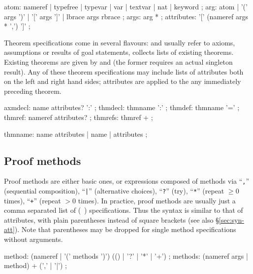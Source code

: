\begin{rail}
  atom: nameref | typefree | typevar | var | textvar | nat | keyword
  ;
  arg: atom | '(' args ')' | '[' args ']' | lbrace args rbrace
  ;
  args: arg *
  ;
  attributes: '[' (nameref args * ',') ']'
  ;
\end{rail}

Theorem specifications come in several flavours:  and
 usually refer to axioms, assumptions or results of goal
statements,  collects lists of existing theorems.
Existing theorems are given by  and 
(the former requires an actual singleton result).  Any of these theorem
specifications may include lists of attributes both on the left and right hand
sides; attributes are applied to the any immediately preceding theorem.

\begin{rail}
  axmdecl: name attributes? ':'
  ;
  thmdecl: thmname ':'
  ;
  thmdef: thmname '='
  ;
  thmref: nameref attributes?
  ;
  thmrefs: thmref +
  ;

  thmname: name attributes | name | attributes
  ;
\end{rail}


\subsection{Proof methods}\label{sec:syn-meth}

Proof methods are either basic ones, or expressions composed of methods via
``\texttt{,}'' (sequential composition), ``\texttt{|}'' (alternative choices),
``\texttt{?}'' (try), ``\texttt{*}'' (repeat ${} \ge 0$ times), ``\texttt{+}''
(repeat ${} > 0$ times).  In practice, proof methods are usually just a comma
separated list of (~) specifications.
Thus the syntax is similar to that of attributes, with plain parentheses
instead of square brackets (see also \S\ref{sec:syn-att}).  Note that
parentheses may be dropped for single method specifications without arguments.

\begin{rail}
  method: (nameref | '(' methods ')') (() | '?' | '*' | '+')
  ;
  methods: (nameref args | method) + (',' | '|')
  ;
\end{rail}


